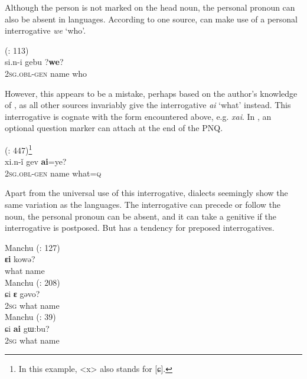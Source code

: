 \documentclass[output=paper,colorlinks,citecolor=brown]{langscibook}
\begin{document}
Although the person is not marked on the head noun, the personal pronoun can also be absent in  languages. According to one source,  can make use of a personal interrogative \textit{we} ‘who’.

\ea
    \label{example4.107}
     (\citealt{Avrorin2000}: 113)\\
    \gll si.n-i		gebu	?\textbf{we}?\\
    2\textsc{sg.obl-gen}	name	who\\
    \z

\noindent However, this appears to be a mistake, perhaps based on the author’s knowledge of , as all other sources invariably give the interrogative \textit{ai} ‘what’ instead. This interrogative is cognate with the  form encountered above, e.g.  \textit{xai}. In , an optional question marker can attach at the end of the PNQ.

\ea
    \label{example4.108}
     (\citealt{Sameng2010}: 447)\footnote{In this example, <x> also stands for [ɕ].}\\
    \gll xi.n-ǐ			gev		\textbf{ai}=ye?\\
    	2\textsc{sg.obl-gen}	name	what=\textsc{q}\\
    \z

Apart from the universal use of this interrogative,  dialects seemingly show the same variation as the  languages. The interrogative can precede or follow the noun, the personal pronoun can be absent, and it can take a genitive if the interrogative is postposed. But  has a tendency for preposed interrogatives.

\ea
    \label{example4.109}
     Manchu (\citealt{ZhaoJie1989H}: 127)\\
    \gll \textbf{ɛi}		kowə?\\
    what		name\\
\ex
    \label{example4.110}
     Manchu (\citealt{WangQingfeng2005H}: 208)\\
    \gll ɕi		\textbf{ɛ}		gəvo?\\
    2\textsc{sg}		what		name\\
\ex
    \label{example4.111}
     Manchu (\citealt{Enhebatu1995H}: 39)\\
    \gll ɕi		\textbf{ai}		gɯ:bu?\\
    2\textsc{sg}		what		name\\
\z
\end{document}
